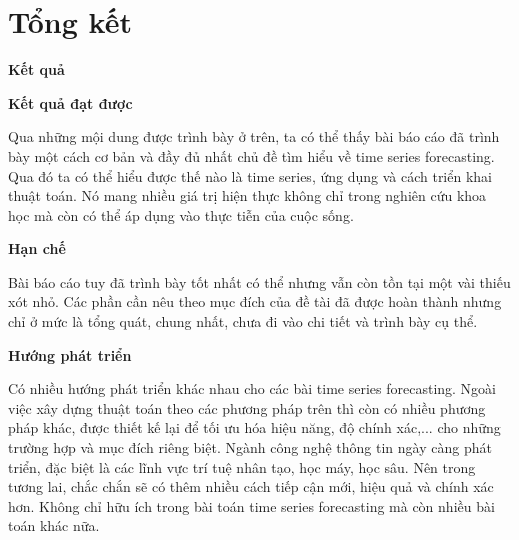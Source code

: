 \chapter{Tổng kết}

%
\bigskip


\setlength{\parindent}{0.0cm}
\textbf{\textbf{Kết quả}}

\vspace{0.5cm}
\setlength{\parindent}{0cm}
\textbf{Kết quả đạt được}

\vspace{0.5cm}


\setlength{\parindent}{0cm}
Qua những mội dung được trình bày ở trên, ta có thể thấy bài báo cáo đã trình bày một cách cơ bản và đầy đủ nhất chủ đề tìm hiểu về time series forecasting. Qua đó ta có thể hiểu được thế nào là time series, ứng dụng và cách triển khai thuật toán. Nó mang nhiều giá trị hiện thực không chỉ trong nghiên cứu khoa học mà còn có thể áp dụng vào thực tiễn của cuộc sống.


\vspace{0.5cm}
\textbf{Hạn chế}


\vspace{0.5cm}


Bài báo cáo tuy đã trình bày tốt nhất có thể nhưng vẫn còn tồn tại một vài thiếu xót nhỏ. Các phần cần nêu theo mục đích của đề tài đã được hoàn thành nhưng chỉ ở mức là tổng quát, chung nhất, chưa đi vào chi tiết và trình bày cụ thể.


\vspace{0.5cm}

\setlength{\parindent}{0.0cm}
\textbf{Hướng phát triển}



\vspace{0.5cm}


Có nhiều hướng phát triển khác nhau cho các bài time series forecasting. Ngoài việc xây dựng thuật toán theo các phương pháp trên thì còn có nhiều phương pháp khác, được thiết kế lại để tối ưu hóa hiệu năng, độ chính xác,... cho những trường hợp và mục đích riêng biệt. Ngành công nghệ thông tin ngày càng phát triển, đặc biệt là các lĩnh vực trí tuệ nhân tạo, học máy, học sâu. Nên trong tương lai, chắc chắn sẽ có thêm nhiều cách tiếp cận mới, hiệu quả và chính xác hơn. Không chỉ hữu ích trong bài toán time series forecasting mà còn nhiều bài toán khác nữa.

